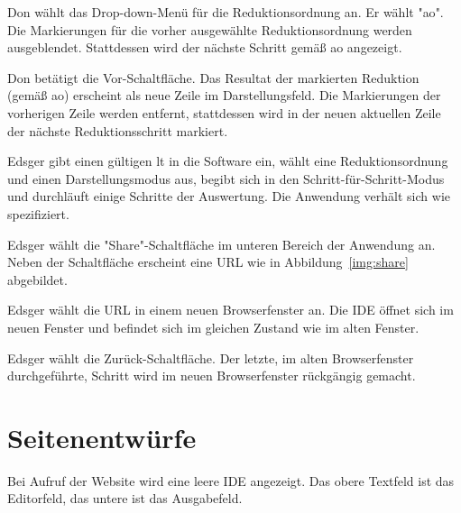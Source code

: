 \documentclass[parskip=full,11pt,twoside]{scrartcl}
\begin{document}
{Don wählt das Drop-down-Menü für die Reduktionsordnung an. Er wählt "\gls{ao}".}
{Die Markierungen für die vorher ausgewählte Reduktionsordnung werden ausgeblendet.
Stattdessen wird der nächste Schritt gemäß \gls{ao} angezeigt.}

{Don betätigt die Vor-Schaltfläche.}
{Das Resultat der markierten Reduktion (gemäß \gls{ao}) erscheint als neue Zeile im Darstellungsfeld.
Die Markierungen der vorherigen Zeile werden entfernt, stattdessen wird in der neuen
aktuellen Zeile der nächste Reduktionsschritt markiert.}


{Edsger gibt einen gültigen \gls{lt} in die Software ein, wählt eine Reduktionsordnung und einen
Darstellungsmodus aus, begibt sich in den Schritt-für-Schritt-Modus und durchläuft einige
Schritte der Auswertung.}
{Die Anwendung verhält sich wie spezifiziert.}

{Edsger wählt die "Share"-Schaltfläche im unteren Bereich der Anwendung an.}
{Neben der Schaltfläche erscheint eine URL wie in Abbildung~\ref{img:share}
abgebildet.}

{Edsger wählt die URL in einem neuen Browserfenster an.}
{Die IDE öffnet sich im neuen Fenster und befindet sich im gleichen Zustand wie im
alten Fenster.}

{Edsger wählt die Zurück-Schaltfläche.}
{Der letzte, im alten Browserfenster durchgeführte, Schritt wird im neuen Browserfenster
rückgängig gemacht.}

%
%
%

\pagebreak
\appendix

\section{Seitenentwürfe}

Bei Aufruf der Website wird eine leere IDE angezeigt. Das obere Textfeld ist das Editorfeld, das untere ist das Ausgabefeld.
\end{document}
